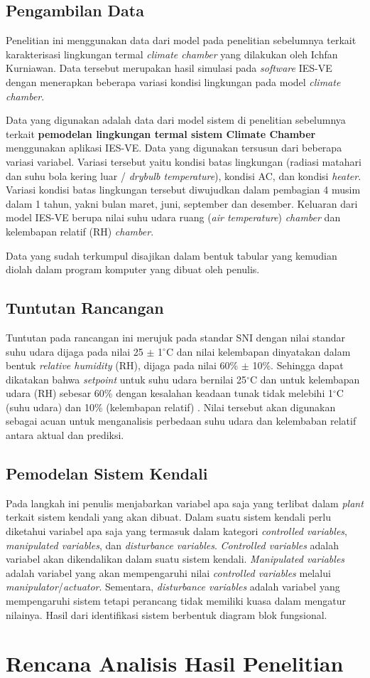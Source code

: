 \subsection{Pengambilan Data}
Penelitian ini menggunakan data dari model pada penelitian sebelumnya terkait karakterisasi lingkungan termal \textit{climate chamber} yang dilakukan oleh Ichfan Kurniawan. Data tersebut merupakan hasil simulasi pada \textit{software} IES-VE dengan menerapkan beberapa variasi kondisi lingkungan pada model \textit{climate chamber}.

Data yang digunakan adalah data dari model sistem di penelitian sebelumnya terkait \textbf{pemodelan lingkungan termal sistem Climate Chamber} menggunakan aplikasi IES-VE. Data yang digunakan tersusun dari beberapa variasi variabel. Variasi tersebut yaitu kondisi batas lingkungan (radiasi matahari dan suhu bola kering luar / \textit{drybulb temperature}), kondisi AC, dan kondisi \textit{heater}. Variasi kondisi batas lingkungan tersebut diwujudkan dalam pembagian 4 musim dalam 1 tahun, yakni bulan maret, juni, september dan desember. Keluaran dari model IES-VE berupa nilai suhu udara ruang (\textit{air temperature}) \textit{chamber} dan kelembapan relatif (RH) \textit{chamber}.

Data yang sudah terkumpul disajikan dalam bentuk tabular yang kemudian diolah dalam program komputer yang dibuat oleh penulis.

\subsection{Tuntutan Rancangan}

Tuntutan pada rancangan ini merujuk pada standar SNI dengan nilai standar suhu udara dijaga pada nilai 25 $\pm$ 1$^{\circ}$C dan nilai kelembapan dinyatakan dalam bentuk \textit{relative humidity} (RH), dijaga pada nilai 60\% $\pm$ 10\%. Sehingga dapat dikatakan bahwa \textit{setpoint} untuk suhu udara bernilai 25$^{\circ}$C dan untuk kelembapan udara (RH) sebesar 60\% dengan kesalahan keadaan tunak tidak melebihi 1$^{\circ}$C (suhu udara) dan 10\% (kelembapan relatif) \cite{SNI-03-06390-2000}. Nilai tersebut akan digunakan sebagai acuan untuk menganalisis perbedaan suhu udara dan kelembaban relatif antara aktual dan prediksi.

\subsection{Pemodelan Sistem Kendali}
Pada langkah ini penulis menjabarkan variabel apa saja yang terlibat dalam \textit{plant} terkait sistem kendali yang akan dibuat. Dalam suatu sistem kendali perlu diketahui variabel apa saja yang termasuk dalam kategori \textit{controlled variables}, \textit{manipulated variables}, dan \textit{disturbance variables}. \textit{Controlled variables} adalah variabel akan dikendalikan dalam suatu sistem kendali. \textit{Manipulated variables} adalah variabel yang akan mempengaruhi nilai \textit{controlled variables} melalui \textit{manipulator}/\textit{actuator}. Sementara, \textit{disturbance variables} adalah variabel yang mempengaruhi sistem tetapi perancang tidak memiliki kuasa dalam mengatur nilainya. Hasil dari identifikasi sistem
berbentuk diagram blok fungsional.

\section{Rencana Analisis Hasil Penelitian}